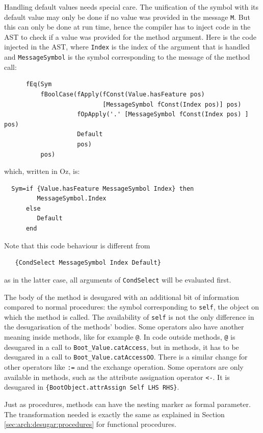 \documentclass[a4paper]{memoir}
\begin{document}
Handling default values needs special care. The unification of the symbol with its default value may only be done
if no value was provided in the message \lstinline!M!. But this can only be done at run time, hence the compiler
has to inject code in the AST to check if a value was provided for the method argument.
Here is the code injected in the AST, where \lstinline!Index! is the index of the argument that is handled and 
\lstinline!MessageSymbol! is the symbol corresponding to the message of the method
call:
\begin{lstlisting}
      fEq(Sym 
          fBoolCase(fApply(fConst(Value.hasFeature pos) 
                           [MessageSymbol fConst(Index pos)] pos)
                    fOpApply('.' [MessageSymbol fConst(Index pos) ] pos)
                    Default 
                    pos) 
          pos)
\end{lstlisting}
which, written in Oz, is:
\begin{lstlisting}
  Sym=if {Value.hasFeature MessageSymbol Index} then 
         MessageSymbol.Index 
      else
         Default
      end
\end{lstlisting}

Note that this code behaviour is different from 
\begin{lstlisting}
   {CondSelect MessageSymbol Index Default}
\end{lstlisting}
as in the latter case, all arguments of \lstinline!CondSelect! will be evaluated
first. 

The body of the method is desugared with an additional bit of information compared to normal procedures: the symbol corresponding to \lstinline!self!, the object on which the method is called. 
The availability of \lstinline!self! is not the only difference in the desugarisation of the methods' bodies. Some operators also have another meaning inside methods, like for example \lstinline!@!.
In code outside methods, \lstinline!@! is desugared in a call to
\lstinline!Boot_Value.catAccess!, but in methods, it has to be desugared in a
call to \lstinline!Boot_Value.catAccessOO!. There is a similar change for other
operators like \lstinline!:=! and the exchange operation.
Some operators are only available in methods, such as the attribute assignation
operator \lstinline!<-!. It is desugared in 
\lstinline!{BootObject.attrAssign Self LHS RHS}!.

Just as procedures, methods can have the nesting marker as formal parameter. The transformation needed
is exactly the same as explained in Section \ref{sec:arch:desugar:procedures} for functional procedures.
\end{document}
